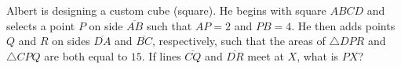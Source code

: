 Albert is designing a custom cube (square). He begins with square $ABCD$ and selects a point $P$ on side $\overline{AB}$ such that $AP=2$ and $PB=4$. He then adds points $Q$ and $R$ on sides $\overline{DA}$ and $\overline{BC}$, respectively, such that the areas of $\triangle DPR$ and $\triangle CPQ$ are both equal to $15$. If lines $\overline{CQ}$ and $\overline{DR}$ meet at $X$, what is $PX$?
